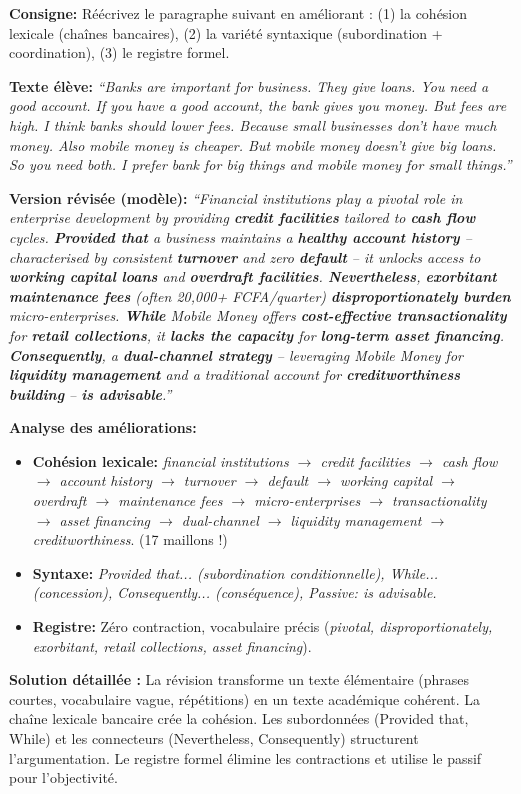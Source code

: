 \documentclass[11pt]{article}
\begin{document}
\begin{exoresolu}
\textbf{Consigne:} Réécrivez le paragraphe suivant en améliorant : (1) la cohésion lexicale (chaînes bancaires), (2) la variété syntaxique (subordination + coordination), (3) le registre formel.

\textbf{Texte élève:}
\textit{``Banks are important for business. They give loans. You need a good account. If you have a good account, the bank gives you money. But fees are high. I think banks should lower fees. Because small businesses don't have much money. Also mobile money is cheaper. But mobile money doesn't give big loans. So you need both. I prefer bank for big things and mobile money for small things.''}

\textbf{Version révisée (modèle):}
\textit{``Financial institutions play a pivotal role in enterprise development by providing \textbf{credit facilities} tailored to \textbf{cash flow} cycles. \textbf{Provided that} a business maintains a \textbf{healthy account history} -- characterised by consistent \textbf{turnover} and zero \textbf{default} -- it unlocks access to \textbf{working capital loans} and \textbf{overdraft facilities}. \textbf{Nevertheless}, \textbf{exorbitant maintenance fees} (often 20,000+ FCFA/quarter) \textbf{disproportionately burden} micro-enterprises. \textbf{While} Mobile Money offers \textbf{cost-effective transactionality} for \textbf{retail collections}, it \textbf{lacks the capacity} for \textbf{long-term asset financing}. \textbf{Consequently}, a \textbf{dual-channel strategy} -- leveraging Mobile Money for \textbf{liquidity management} and a traditional account for \textbf{creditworthiness building} -- \textbf{is advisable}.''}

\textbf{Analyse des améliorations:}
\begin{itemize}
    \item \textbf{Cohésion lexicale:} \textit{financial institutions $\rightarrow$ credit facilities $\rightarrow$ cash flow $\rightarrow$ account history $\rightarrow$ turnover $\rightarrow$ default $\rightarrow$ working capital $\rightarrow$ overdraft $\rightarrow$ maintenance fees $\rightarrow$ micro-enterprises $\rightarrow$ transactionality $\rightarrow$ asset financing $\rightarrow$ dual-channel $\rightarrow$ liquidity management $\rightarrow$ creditworthiness}. (17 maillons !)
    \item \textbf{Syntaxe:} \textit{Provided that... (subordination conditionnelle), While... (concession), Consequently... (conséquence), Passive: is advisable.}
    \item \textbf{Registre:} Zéro contraction, vocabulaire précis (\textit{pivotal, disproportionately, exorbitant, retail collections, asset financing}).
\end{itemize}
\tcblower
\textbf{Solution détaillée :} La révision transforme un texte élémentaire (phrases courtes, vocabulaire vague, répétitions) en un texte académique cohérent. La chaîne lexicale bancaire crée la cohésion. Les subordonnées (Provided that, While) et les connecteurs (Nevertheless, Consequently) structurent l'argumentation. Le registre formel élimine les contractions et utilise le passif pour l'objectivité.
\end{exoresolu}
\end{document}
